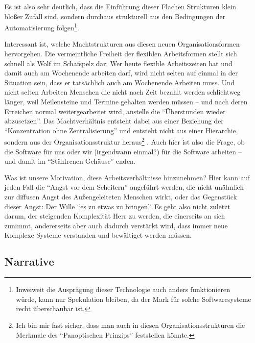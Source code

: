Es ist also sehr deutlich, dass die Einführung dieser Flachen Strukturen klein bloßer Zufall sind, sondern durchaus strukturell aus den Bedingungen der Automatisierung folgen\footnote{Inweiweit die Ausprägung dieser Technologie auch anders funktionieren würde, kann nur Spekulation bleiben, da der Mark für solche Softwaresysteme recht überschaubar ist\parencite[173]{arbeitsfrei}.}.

Interessant ist, welche Machtstrukturen aus diesen neuen Organisationsformen hervorgehen.
Die vermeintliche Freiheit der flexiblen Arbeitsformen stellt sich schnell als Wolf im Schafspelz dar: Wer heute flexible Arbeitszeiten hat und damit auch am Wochenende arbeiten darf, wird nicht selten auf einmal in der Situation sein, dass er tatsächlich auch am Wochenende Arbeiten muss. Und nicht selten Arbeiten Menschen die nicht nach Zeit bezahlt werden schlichtweg länger, weil Meilensteine und Termine gehalten werden müssen – und nach deren Erreichen normal weitergearbeitet wird, anstelle die \enquote{Überstunden wieder abzusetzen}.
Das Machtverhältnis entsteht dabei aus einer Beziehung der \enquote{Konzentration ohne Zentralisierung} und entsteht nicht aus einer Hierarchie, sondern aus der Organisationsstruktur heraus\footnote{Ich bin mir fast sicher, dass man auch in diesen Organisationsstrukturen die Merkmale des \enquote{Panoptischen Prinzips} feststellen könnte\parencite{foucault}.} \parencite[70]{sennett}.
Auch hier ist also die Frage, ob die Software für uns oder wir (irgendwann einmal?) für die Software arbeiten – und damit im \enquote{Stählrenen Gehäuse} enden.

Was ist unsere Motivation, diese Arbeitsverhältnisse hinzunehmen?
Hier kann auf jeden Fall die \enquote{Angst vor dem Scheitern} angeführt werden\parencite[159ff.]{sennett}, die nicht unähnlich zur diffusen Angst des Außengeleiteten Menschen wirkt, oder das Gegenstück dieser Angst: Der Wille \enquote{es zu etwas zu bringen}.
Es geht also nicht zuletzt darum, der steigenden Komplexität Herr zu werden, die einerseits an sich zunimmt, andererseits aber auch dadurch verstärkt wird, dass immer neue Komplexe Systeme verstanden und bewältiget werden müssen.


\subsection{Narrative}

